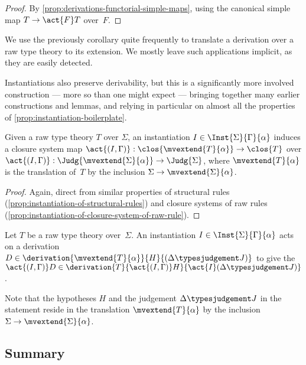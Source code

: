 \begin{proof}
 By \cref{prop:derivations-functorial-simple-maps}, using the canonical simple map $T \to \act{F}T$ over~$F$.
\end{proof}

We use the previously corollary quite frequently to translate a derivation over a raw type theory to its extension. We mostly leave such applications implicit, as they are easily detected.

Instantiations also preserve derivability, but this is a significantly more involved construction --- more so than one might expect --- bringing together many earlier constructions and lemmas, and relying in particular on almost all the properties of \cref{prop:instantiation-boilerplate}.

\begin{proposition} \label{cor:instantiation-acts-on-flattening}
  Given a raw type theory $T$ over $\Sigma$, an instantiation $I \in \Inst{\Sigma}{\Gamma}{\alpha}$ induces a closure system map $\act{(I,\Gamma)} : \clos{\mvextend{T}{\alpha}} \to \clos{T}$ over $\act{(I,\Gamma)} : \Judg{\mvextend{\Sigma}{\alpha}} \to \Judg{\Sigma}$, where $\mvextend{T}{\alpha}$ is the translation of~$T$ by the inclusion $\Sigma \to \mvextend{\Sigma}{\alpha}$.
\end{proposition}

\begin{proof}
  Again, direct from similar properties of structural rules (\cref{prop:instantiation-of-structural-rules}) and closure systems of raw rules (\cref{prop:instantiation-of-closure-system-of-raw-rule}).
\end{proof}

\begin{corollary} \label{cor:instantiation-of-derivations}
  Let $T$ be a raw type theory over~$\Sigma$.
  An instantiation $I \in \Inst{\Sigma}{\Gamma}{\alpha}$ acts on a derivation $D \in \derivation{\mvextend{T}{\alpha}}{H}{(\Delta \typesjudgement J)}$ to give the  $\act{(I, \Gamma)} D \in \derivation{T}{\act{(I, \Gamma)} H}{\act{I}(\Delta \typesjudgement J)}$.
\end{corollary}

Note that the hypotheses $H$ and the judgement $\Delta \typesjudgement J$ in the statement reside in the translation $\mvextend{T}{\alpha}$ by the inclusion $\Sigma \to \mvextend{\Sigma}{\alpha}$.


\subsection{Summary}

